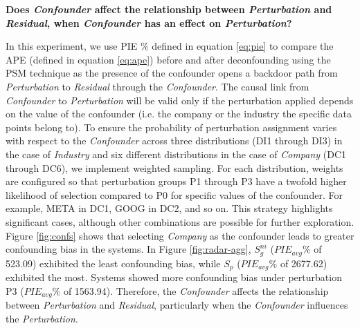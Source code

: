 {\color{blue}} \textbf{Does \emph{Confounder} affect the relationship between \emph{Perturbation} and \emph{Residual}, when \emph{Confounder} has an effect on \emph{Perturbation}?}


 In this experiment, we use PIE \% defined in equation \ref{eq:pie} to compare the APE (defined in equation \ref{eq:ape}) before and after deconfounding using the PSM technique as the presence of the confounder opens a backdoor path from \emph{Perturbation} to  \emph{Residual} through the \emph{Confounder}. The causal link from \emph{Confounder} to \emph{Perturbation} will be valid only if the perturbation applied depends on the value of the confounder (i.e. the company or the industry the specific data points belong to). To ensure the probability of perturbation assignment varies with respect to the \emph{Confounder} across three distributions (DI1 through DI3) in the case of \emph{Industry} and six different distributions in the case of \emph{Company} (DC1 through DC6), we implement weighted sampling. For each distribution, weights are configured so that perturbation groups P1 through P3 have a twofold higher likelihood of selection compared to P0 for specific values of the confounder. For example, META in DC1, GOOG in DC2, and so on. This strategy highlights significant cases, although other combinations are possible for further exploration. 
 Figure \ref{fig:confs} shows that selecting \textit{Company} as the confounder leads to greater confounding bias in the systems. In Figure \ref{fig:radar-agg}, $S_g^{ni}$ ($PIE_{avg} \%$ of 523.09) exhibited the least confounding bias, while $S_p$ ($PIE_{avg} \%$ of 2677.62) exhibited the most. Systems showed more confounding bias under perturbation P3 ($PIE_{avg} \%$ of 1563.94). Therefore, the \emph{Confounder} affects the relationship between \emph{Perturbation} and \emph{Residual}, particularly when the \emph{Confounder} influences the \emph{Perturbation}.

